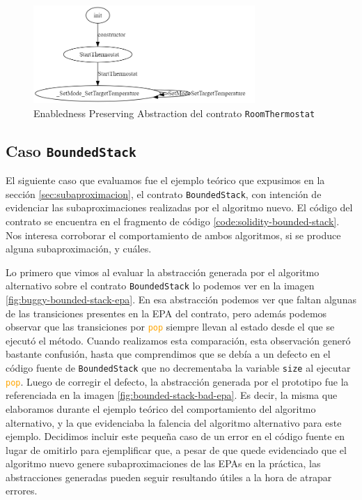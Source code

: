 \begin{figure}
    \centering
    \includegraphics[width=0.75\textwidth]{figs/room-thermostate-epa.png}
    \caption{Enabledness Preserving Abstraction del contrato \texttt{RoomThermostat} }
    \label{fig:room-thermostat-epa}
\end{figure}

\subsection{Caso \texttt{BoundedStack}}
El siguiente caso que evaluamos fue el ejemplo teórico que expusimos en la sección \ref{sec:subaproximacion}, el contrato \texttt{BoundedStack}, con intención de evidenciar las subaproximaciones realizadas por el algoritmo nuevo.
El código del contrato se encuentra en el fragmento de código \ref{code:solidity-bounded-stack}.
Nos interesa corroborar el comportamiento de ambos algoritmos, si se produce alguna subaproximación, y cuáles.

Lo primero que vimos al evaluar la abstracción generada por el algoritmo alternativo sobre el contrato \texttt{BoundedStack} lo podemos ver en la imagen \ref{fig:buggy-bounded-stack-epa}.
En esa abstracción  podemos ver que faltan algunas de las transiciones presentes en la EPA del contrato, pero además podemos observar que las transiciones por \textcolor{orange}{\texttt{pop}} siempre llevan al estado desde el que se ejecutó el método.
Cuando realizamos esta comparación, esta observación generó bastante confusión, hasta que comprendimos que se debía a un defecto en el código fuente de \texttt{BoundedStack} que no decrementaba la variable \texttt{size} al ejecutar \textcolor{orange}{\texttt{pop}}.
Luego de corregir el defecto, la abstracción generada por el prototipo fue la referenciada en la imagen \ref{fig:bounded-stack-bad-epa}.
Es decir, la misma que elaboramos durante el ejemplo teórico del comportamiento del algoritmo alternativo, y la que evidenciaba la falencia del algoritmo alternativo para este ejemplo.
Decidimos incluir este pequeña caso de un error en el código fuente en lugar de omitirlo para ejemplificar que, a pesar de que quede evidenciado que el algoritmo nuevo genere subaproximaciones de las EPAs en la práctica, las abstracciones generadas pueden seguir resultando útiles a la hora de atrapar errores.

